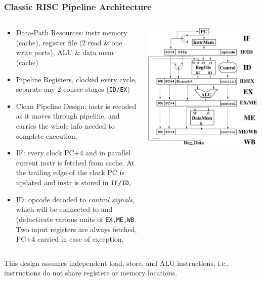 \documentclass{beamer}
\newcommand{\emp}[1]{\textcolor{DikuRed}{ #1}}
\begin{document}
\begin{frame}[fragile,t]
\frametitle{Classic RISC Pipeline Architecture}

\begin{columns}
\begin{scriptsize}
\begin{itemize}
\item \emp{Data-Path Resources}: instr memory (cache), register file (2 read \& one write ports), 
            ALU \& data mem (cache)\smallskip
\item \emp{Pipeline Registers}, clocked every cycle, separate any 2 consec stages ({\tt ID/EX})\smallskip
\item \emp{Clean Pipeline Design}: instr is recoded as it moves through pipeline,
            and carries the whole info needed to complete execution.
\item \emp{IF:} every clock PC+4 and in parallel current instr is fetched from cache. 
                At the trailing edge of the clock PC is updated and instr is stored in 
                {\tt IF/ID},
\item \emp{ID:} opcode decoded to {\em control signals}, which will be connected to
                and (de)activate various units of {\tt EX,ME,WB}.
                Two input registers are always fetched, PC+4 carried in case of exception.
\end{itemize}
\end{scriptsize}
\vspace{-2ex}
\includegraphics[width=37ex]{Figures/ClassicPipeline}
\end{columns}

\bigskip
\emp{This design assumes independent load, store, and ALU instructions},
i.e., instructions do not share registers or memory locations.

\end{frame}
\end{document}
